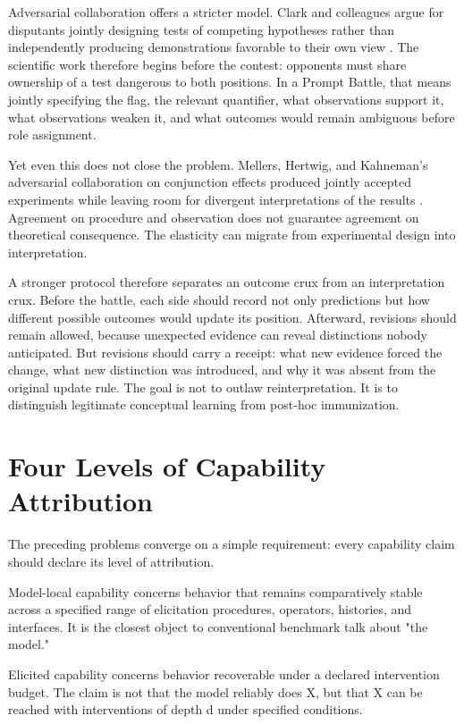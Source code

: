 \documentclass[11pt]{article}
\begin{document}
Adversarial collaboration offers a stricter model. Clark and colleagues argue for disputants jointly designing tests of competing hypotheses rather than independently producing demonstrations favorable to their own view \cite{clark2022enemies}. The scientific work therefore begins before the contest: opponents must share ownership of a test dangerous to both positions. In a Prompt Battle, that means jointly specifying the flag, the relevant quantifier, what observations support it, what observations weaken it, and what outcomes would remain ambiguous before role assignment.

Yet even this does not close the problem. Mellers, Hertwig, and Kahneman's adversarial collaboration on conjunction effects produced jointly accepted experiments while leaving room for divergent interpretations of the results \cite{mellers2001frequency}. Agreement on procedure and observation does not guarantee agreement on theoretical consequence. The elasticity can migrate from experimental design into interpretation.

A stronger protocol therefore separates an outcome crux from an interpretation crux. Before the battle, each side should record not only predictions but how different possible outcomes would update its position. Afterward, revisions should remain allowed, because unexpected evidence can reveal distinctions nobody anticipated. But revisions should carry a receipt: what new evidence forced the change, what new distinction was introduced, and why it was absent from the original update rule. The goal is not to outlaw reinterpretation. It is to distinguish legitimate conceptual learning from post-hoc immunization.

\section{Four Levels of Capability Attribution}
The preceding problems converge on a simple requirement: every capability claim should declare its level of attribution.

Model-local capability concerns behavior that remains comparatively stable across a specified range of elicitation procedures, operators, histories, and interfaces. It is the closest object to conventional benchmark talk about "the model."

Elicited capability concerns behavior recoverable under a declared intervention budget. The claim is not that the model reliably does X, but that X can be reached with interventions of depth d under specified conditions.
\end{document}
